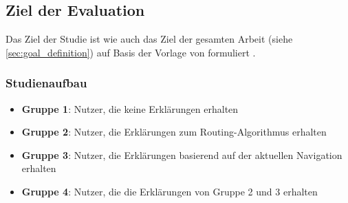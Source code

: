 \subsection{Ziel der Evaluation}

Das Ziel der Studie ist wie auch das Ziel der gesamten Arbeit (siehe \autoref{sec:goal_definition}) auf Basis der Vorlage von \citeauthor{wohlin2012experimentation} formuliert \cite{wohlin2012experimentation}.

\noindent{}

\subsubsection{Studienaufbau}

\begin{itemize}
    \item \textbf{Gruppe 1}: Nutzer, die keine Erklärungen erhalten
    \item \textbf{Gruppe 2}: Nutzer, die Erklärungen zum Routing-Algorithmus erhalten
    \item \textbf{Gruppe 3}: Nutzer, die Erklärungen basierend auf der aktuellen Navigation erhalten
    \item \textbf{Gruppe 4}: Nutzer, die die Erklärungen von Gruppe 2 und 3 erhalten
\end{itemize}